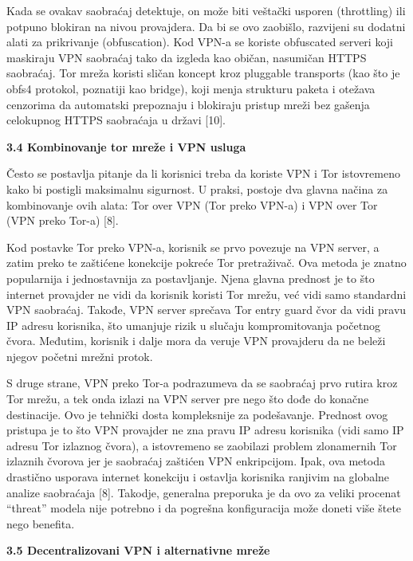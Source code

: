 \documentclass[
]{article}
\begin{document}
Kada se ovakav saobraćaj detektuje, on može biti veštački usporen
(throttling) ili potpuno blokiran na nivou provajdera. Da bi se ovo
zaobišlo, razvijeni su dodatni alati za prikrivanje (obfuscation). Kod
VPN-a se koriste obfuscated serveri koji maskiraju VPN saobraćaj tako da
izgleda kao običan, nasumičan HTTPS saobraćaj. Tor mreža koristi sličan
koncept kroz pluggable transports (kao što je obfs4 protokol, poznatiji
kao bridge), koji menja strukturu paketa i otežava cenzorima da
automatski prepoznaju i blokiraju pristup mreži bez gašenja celokupnog
HTTPS saobraćaja u državi {[}10{]}.

\protect\hypertarget{_Toc234141047}{}{}\textbf{3.4 Kombinovanje tor
mreže i VPN usluga}

Često se postavlja pitanje da li korisnici treba da koriste VPN i Tor
istovremeno kako bi postigli maksimalnu sigurnost. U praksi, postoje dva
glavna načina za kombinovanje ovih alata: Tor over VPN (Tor preko VPN-a)
i VPN over Tor (VPN preko Tor-a) {[}8{]}.

Kod postavke Tor preko VPN-a, korisnik se prvo povezuje na VPN server, a
zatim preko te zaštićene konekcije pokreće Tor pretraživač. Ova metoda
je znatno popularnija i jednostavnija za postavljanje. Njena glavna
prednost je to što internet provajder ne vidi da korisnik koristi Tor
mrežu, već vidi samo standardni VPN saobraćaj. Takođe, VPN server
sprečava Tor entry guard čvor da vidi pravu IP adresu korisnika, što
umanjuje rizik u slučaju kompromitovanja početnog čvora. Međutim,
korisnik i dalje mora da veruje VPN provajderu da ne beleži njegov
početni mrežni protok.

S druge strane, VPN preko Tor-a podrazumeva da se saobraćaj prvo rutira
kroz Tor mrežu, a tek onda izlazi na VPN server pre nego što dođe do
konačne destinacije. Ovo je tehnički dosta kompleksnije za podešavanje.
Prednost ovog pristupa je to što VPN provajder ne zna pravu IP adresu
korisnika (vidi samo IP adresu Tor izlaznog čvora), a istovremeno se
zaobilazi problem zlonamernih Tor izlaznih čvorova jer je saobraćaj
zaštićen VPN enkripcijom. Ipak, ova metoda drastično usporava internet
konekciju i ostavlja korisnika ranjivim na globalne analize saobraćaja
{[}8{]}. Takodje, generalna preporuka je da ovo za veliki procenat
``threat'' modela nije potrebno i da pogrešna konfiguracija može doneti
više štete nego benefita.

\protect\hypertarget{_Toc234141048}{}{}\textbf{3.5 Decentralizovani VPN
i alternativne mreže}
\end{document}
